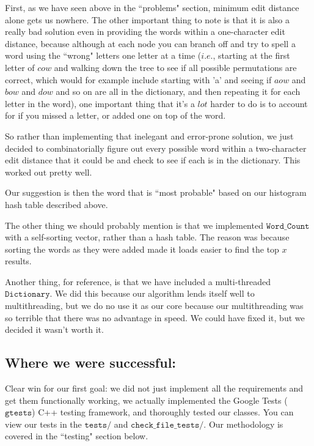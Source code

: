 \documentclass[a4paper]{article}
\begin{document}
First, as we have seen above in the ``problems" section, minimum edit distance alone gets us nowhere. The other important thing to note is that it is also a really bad solution even in providing the words within a one-character edit distance, because although at each node you can branch off and try to spell a word using the ``wrong" letters one letter at a time ($\textit{i.e.}$, starting at the first letter of $\textit{cow}$ and walking down the tree to see if all possible permutations are correct, which would for example include starting with 'a' and seeing if $\textit{aow}$ and $\textit{bow}$ and $\textit{dow}$ and so on are all in the dictionary, and then repeating it for each letter in the word), one important thing that it's a $\textit{lot}$ harder to do is to account for if you missed a letter, or added one on top of the word.

So rather than implementing that inelegant and error-prone solution, we just decided to combinatorially figure out every possible word within a two-character edit distance that it could be and check to see if each is in the dictionary. This worked out pretty well.

Our suggestion is then the word that is ``most probable" based on our histogram hash table described above.

The other thing we should probably mention is that we implemented $\texttt{Word\_Count}$ with a self-sorting vector, rather than a hash table. The reason was because sorting the words as they were added made it loads easier to find the top $x$ results.

Another thing, for reference, is that we have included a multi-threaded $\texttt{Dictionary}$. We did this because our algorithm lends itself well to multithreading, but we do no use it as our core because our multithreading was so terrible that there was no advantage in speed. We could have fixed it, but we decided it wasn't worth it.


\subsection*{Where we were successful:}

Clear win for our first goal: we did not just implement all the requirements and get them functionally working, we actually implemented the Google Tests ($\texttt{gtests}$) C++ testing framework, and thoroughly tested our classes. You can view our tests in the $\texttt{tests/}$ and $\texttt{check\_file\_tests/}$. Our methodology is covered in the ``testing" section below.
\end{document}
